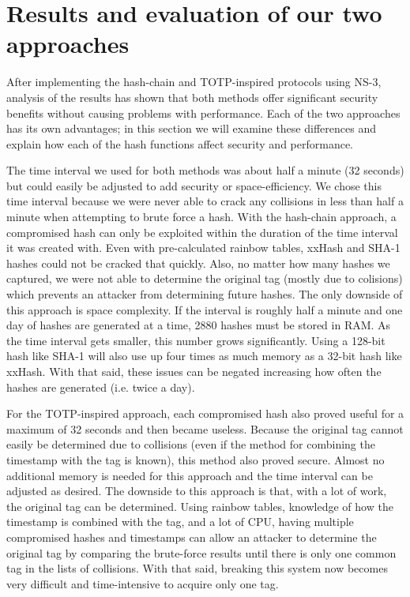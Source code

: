 \documentclass[12pt]{article} %
\begin{document}

\newpage %



\section{Results and evaluation of our two approaches}

After implementing the hash-chain and TOTP-inspired protocols using NS-3, analysis of the results has shown that both methods offer significant security benefits without causing problems with performance. Each of the two approaches has its own advantages; in this section we will examine these differences and explain how each of the hash functions affect security and performance.

The time interval we used for both methods was about half a minute (32 seconds) but could easily be adjusted to add security or space-efficiency. We chose this time interval because we were never able to crack any collisions in less than half a minute when attempting to brute force a hash. With the hash-chain approach, a compromised hash can only be exploited within the duration of the time interval it was created with. Even with pre-calculated rainbow tables, xxHash and SHA-1 hashes could not be cracked that quickly. Also, no matter how many hashes we captured, we were not able to determine the original tag (mostly due to colisions) which prevents an attacker from determining future hashes. The only downside of this approach is space complexity. If the interval is roughly half a minute and one day of hashes are generated at a time, 2880 hashes must be stored in RAM. As the time interval gets smaller, this number grows significantly. Using a 128-bit hash like SHA-1 will also use up four times as much memory as a 32-bit hash like xxHash. With that said, these issues can be negated increasing how often the hashes are generated (i.e. twice a day).

For the TOTP-inspired approach, each compromised hash also proved useful for a maximum of 32 seconds and then became useless. Because the original tag cannot easily be determined due to collisions (even if the method for combining the timestamp with the tag is known), this method also proved secure. Almost no additional memory is needed for this approach and the time interval can be adjusted as desired. The downside to this approach is that, with a lot of work, the original tag can be determined. Using rainbow tables, knowledge of how the timestamp is combined with the tag, and a lot of CPU, having multiple compromised hashes and timestamps can allow an attacker to determine the original tag by comparing the brute-force results until there is only one common tag in the lists of collisions. With that said, breaking this system now becomes very difficult and time-intensive to acquire only one tag.
\end{document}
